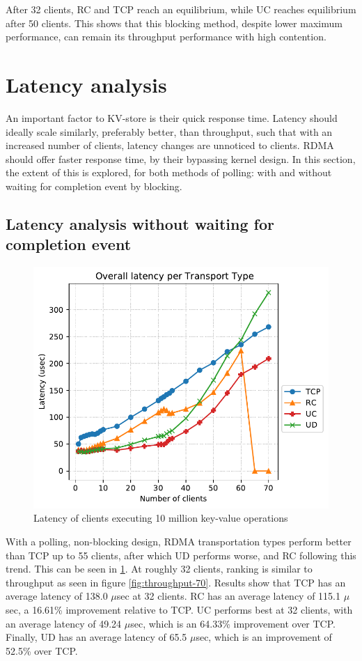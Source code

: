After 32 clients, RC and TCP reach an equilibrium, while UC reaches equilibrium after 50 clients.
This shows that this blocking method, despite lower maximum performance, can remain its throughput performance with high contention.


\section{Latency analysis}\label{sec:latency:analysis}
An important factor to KV-store is their quick response time.
Latency should ideally scale similarly, preferably better, than throughput, such that with an increased number of clients, latency changes are unnoticed to clients.
RDMA should offer faster response time, by their bypassing kernel design.
In this section, the extent of this is explored, for both methods of polling: with and without waiting for completion event by blocking.

\subsection{Latency analysis without waiting for completion event}

\begin{figure}
    \centering
    \includegraphics[width=\columnwidth]{figures/PDF/Latency_avg_70}
    \caption{Latency of clients executing 10 million key-value operations}
    \label{fig:latency-70}
\end{figure}

With a polling, non-blocking design, RDMA transportation types perform better than TCP up to 55 clients, after which UD performs worse, and RC following this trend. This can be seen in \ref{fig:latency-70}.
At roughly 32 clients, ranking is similar to throughput as seen in figure \ref{fig:throughput-70}.
Results show that TCP has an average latency of 138.0 $\mu$sec at 32 clients.
RC has an average latency of 115.1 $\mu$sec, a 16.61\% improvement relative to TCP.
UC performs best at 32 clients, with an average latency of 49.24 $\mu$sec, which is an 64.33\% improvement over TCP.
Finally, UD has an average latency of 65.5 $\mu$sec, which is an improvement of 52.5\% over TCP.

